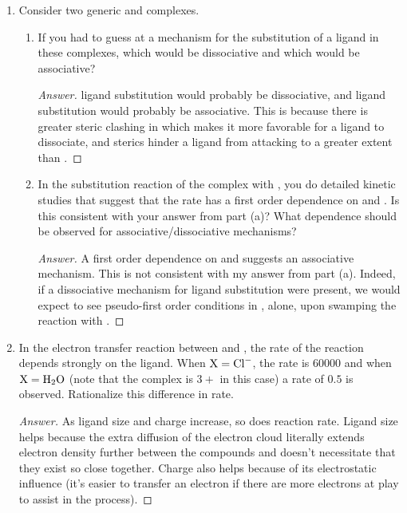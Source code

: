 \documentclass[../psets.tex]{subfiles}
\begin{document}
\begin{enumerate}
\begin{enumerate}
\begin{proof}[Answer]
        \end{proof}
    \end{enumerate}
    \item Consider two generic  and  complexes.
    \begin{enumerate}
        \item If you had to guess at a mechanism for the substitution of a ligand  in these complexes, which would be dissociative and which would be associative?
        \begin{proof}[Answer]
             ligand substitution would probably be dissociative, and  ligand substitution would probably be associative. This is because there is greater steric clashing in  which makes it more favorable for a ligand to dissociate, and sterics hinder a ligand  from attacking  to a greater extent than .
        \end{proof}
        \item In the substitution reaction of the  complex with , you do detailed kinetic studies that suggest that the rate has a first order dependence on \ce{[ML6]} and \ce{[L$'$]}. Is this consistent with your answer from part (a)? What dependence should be observed for associative/dissociative mechanisms?
        \begin{proof}[Answer]
            A first order dependence on \ce{[ML6]} and \ce{[L$'$]} suggests an associative mechanism. This is not consistent with my answer from part (a). Indeed, if a dissociative mechanism for  ligand substitution were present, we would expect to see pseudo-first order conditions in \ce{[ML6]}, alone, upon swamping the reaction with \ce{[L$'$]}.
        \end{proof}
    \end{enumerate}
    \item In the electron transfer reaction between  and , the rate of the reaction depends strongly on the  ligand. When $\ce{X}=\ce{Cl-}$, the rate is $\num{60000}$ and when $\ce{X}=\ce{H2O}$ (note that the complex is $3+$ in this case) a rate of $0.5$ is observed. Rationalize this difference in rate.
    \begin{proof}[Answer]
        As ligand size and charge increase, so does reaction rate. Ligand size helps because the extra diffusion of the electron cloud literally extends electron density further between the compounds and doesn't necessitate that they exist so close together. Charge also helps because of its electrostatic influence (it's easier to transfer an electron if there are more electrons at play to assist in the process).

\end{proof}
\end{enumerate}
\end{document}
